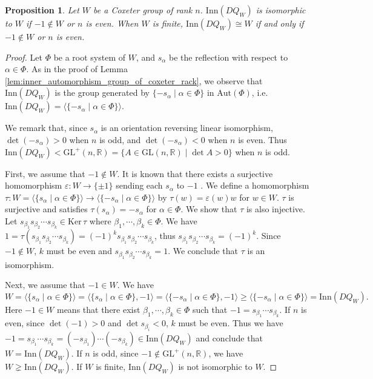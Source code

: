 \documentclass{amsart}
\newtheorem{proposition}[theorem]{Proposition}
\theoremstyle{definition}
\theoremstyle{remark}
\numberwithin{equation}{section}
\begin{document}
\begin{proposition}
\label{prop:inner_auto_of_DQ_W}
Let $W$ be a Coxeter group of rank $n$.
$\mathrm{Inn} (DQ_{W})$ is isomorphic to $W$ if $-1 \notin W$ or $n$ is even.
When $W$ is finite, 
$\mathrm{Inn} (DQ_{W}) \cong W$ if and only if $-1 \notin W$ or $n$ is even.
\end{proposition}
\begin{proof}
Let $\Phi$ be a root system of $W$, 
and $s_{\alpha}$ be the reflection with respect to $\alpha \in \Phi$.
As in the proof of Lemma \ref{lem:inner_automorphism_group_of_coxeter_rack}, 
we observe that $\mathrm{Inn} (DQ_W)$ is the group generated by 
$\{ -s_{\alpha} \mid \alpha \in \Phi \}$ in $\mathrm{Aut} (\Phi)$, 
i.e. $\mathrm{Inn} (DQ_W) = \langle \{ -s_{\alpha} \mid \alpha \in \Phi \} \rangle$.

We remark that, since $s_{\alpha}$ is an orientation reversing linear isomorphism, 
$\det ( - s_{\alpha}) > 0$ when $n$ is odd, 
and $\det ( - s_{\alpha}) < 0$ when $n$ is even.
Thus 
$\mathrm{Inn} (DQ_W) 
< \mathrm{GL}^+(n, \mathbb{R}) = \{ A \in \mathrm{GL}(n, \mathbb{R}) \mid \det A > 0\}$
when $n$ is odd.

First, we assume that $-1 \notin W$.
It is known that there exists a surjective homomorphism
$\varepsilon : W \to \{ \pm 1\}$ sending each $s_\alpha$ to $-1$ 
\cite[Proposition 5.1]{Humphreys}.
We define a homomorphism 
$\tau : W = \langle \{ s_{\alpha} \mid \alpha \in \Phi \} \rangle 
\to \langle \{ -s_{\alpha} \mid \alpha \in \Phi \} \rangle$
by $\tau(w)  = \varepsilon(w) w$ for $w \in W$.
$\tau$ is surjective and 
satisfies $\tau(s_\alpha)  = - s_{\alpha}$ for $\alpha \in \Phi$.
We show that $\tau$ is also injective.
Let $s_{\beta_1} s_{\beta_2} \cdots s_{\beta_k} \in \mathrm{Ker} \, \tau$ 
where $\beta_1, \cdots , \beta_k \in \Phi$.
We have $1 = \tau(s_{\beta_1} s_{\beta_2} \cdots s_{\beta_k}) 
= (-1)^k s_{\beta_1} s_{\beta_2} \cdots s_{\beta_k}$, 
thus $s_{\beta_1} s_{\beta_2} \cdots s_{\beta_k} = (-1)^k$.
Since $-1 \notin W$, $k$ must be even and
$s_{\beta_1} s_{\beta_2} \cdots s_{\beta_k} = 1$.
We conclude that $\tau$ is an isomorphism.

Next, we assume that $-1 \in W$.
We have
\[
W = \langle \{ s_{\alpha} \mid \alpha \in \Phi \} \rangle
= \langle \{ s_{\alpha} \mid \alpha \in \Phi \}, -1  \rangle
= \langle \{ -s_{\alpha} \mid \alpha \in \Phi \}, -1  \rangle
\geq \langle \{ -s_{\alpha} \mid \alpha \in \Phi \} \rangle
= \mathrm{Inn} (DQ_W).
\]
Here $-1 \in W$ means that there exist $\beta_1 , \cdots , \beta_k \in \Phi$
such that $-1 = s_{\beta_1} \cdots s_{\beta_k}$.
If $n$ is even, 
since $\det (-1) > 0$ and $\det s_{\beta_i} < 0$, $k$ must be even.
Thus we have $-1 = s_{\beta_1} \cdots s_{\beta_k} = (-s_{\beta_1}) \cdots (-s_{\beta_k})
\in \mathrm{Inn} (DQ_W)$ and conclude that $W = \mathrm{Inn} (DQ_W)$.
If $n$ is odd, since $-1 \notin \mathrm{GL}^+(n, \mathbb{R})$, 
we have $W \gneq \mathrm{Inn} (DQ_W)$. 
If $W$ is finite, $\mathrm{Inn} (DQ_W)$ is not isomorphic to $W$. 
\end{proof}
\end{document}
